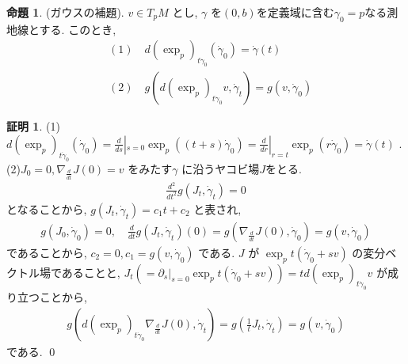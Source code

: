 \documentclass[10pt, fleqn, label-section=none]{bxjsarticle}
\theoremstyle{definition}
\newtheorem{prop}[dfn]{命題}
\newtheorem*{pf*}{証明}
\renewcommand{\-}{\hyphen}
\begin{document}
\begin{prop}(ガウスの補題).
$v \in T_p M$ とし, $\gamma$ を$(0,b)$を定義域に含む$\gamma_0 = p$なる測地線とする. このとき, 
\begin{align*} &(1) \quad d(\exp_p)_{t \dot \gamma_0} (\dot \gamma_0) = \dot \gamma (t) \\&(2)\quad g(d(\exp_p)_{t \dot \gamma_0} v, \dot \gamma_t) = g(v, \dot \gamma_0)\end{align*}
\end{prop}
\begin{pf*}(1)
$d(\exp_p)_{t \dot \gamma_0} (\dot \gamma_0)  = \frac{d}{ds}|_{s=0} \exp_p ((t+s)\dot \gamma_0) = \frac{d}{dr}|_{r = t} \exp_p(r \dot \gamma _0) =  \dot \gamma (t)  \,\,.$ \\
(2)$J_0 = 0, \nabla_{\frac{d}{dt}} J (0) = v$ をみたす$\gamma$ に沿うヤコビ場$J$をとる. 
\begin{align*} \frac{d^2}{dt^2} g(J_t, \dot \gamma_t) = 0\end{align*}
となることから, $g(J_t, \dot \gamma_t ) = c_1 t + c_2$ と表され,
\begin{align*} g(J_0, \dot \gamma_0)  = 0, \quad  \frac{d}{dt}g(J_t, \dot \gamma_t) (0)= g(\nabla_{\frac{d}{dt} } J(0), \dot \gamma_0) = g(v, \dot \gamma_0) \end{align*}
であることから, $c_2 = 0, c_1 = g(v, \dot \gamma_0)$ である. $J$ が $\exp_p t(\dot \gamma_0 + s v)$ の変分ベクトル場であることと, $J_t (= \partial_s|_{s = 0} \exp_p t(\dot \gamma_0 + s v))= t d (\exp_p) _{t \dot \gamma_0} v$ が成り立つことから, 
\begin{align*} g(d(\exp_p)_{t \dot \gamma_0} \nabla_{\frac{d}{dt} } J(0), \dot \gamma_t  ) = g (\frac{1}{t} J_t, \dot \gamma_t)  = g (v, \dot \gamma_0)\end{align*}
である. 
\qed
\end{pf*}
\end{document}
